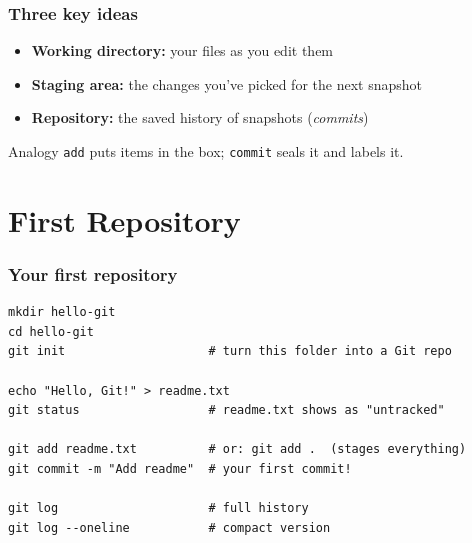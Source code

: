 \documentclass[aspectratio=169,10pt,compress]{beamer}
\newcommand{\cmd}[1]{\texttt{\color{gitred}#1}}
\begin{document}
\begin{frame}[t,fragile] \frametitle{Three key ideas}
  \begin{center}
  \end{center}

  \vspace{0.3em}
  \begin{itemize}
    \item \textbf{Working directory:} your files as you edit them
    \item \textbf{Staging area:} the changes you've picked for the next snapshot
    \item \textbf{Repository:} the saved history of snapshots (\emph{commits})
  \end{itemize}

  \begin{alertblock}{Analogy}
    \cmd{add} puts items in the box; \cmd{commit} seals it and labels it.
  \end{alertblock}
\end{frame}

\section[First Repo]{First Repository}

\begin{frame}[t,fragile] \frametitle{Your first repository}
\begin{lstlisting}
mkdir hello-git
cd hello-git
git init                    # turn this folder into a Git repo

echo "Hello, Git!" > readme.txt
git status                  # readme.txt shows as "untracked"

git add readme.txt          # or: git add .  (stages everything)
git commit -m "Add readme"  # your first commit!

git log                     # full history
git log --oneline           # compact version
\end{lstlisting}
\end{frame}
\end{document}
